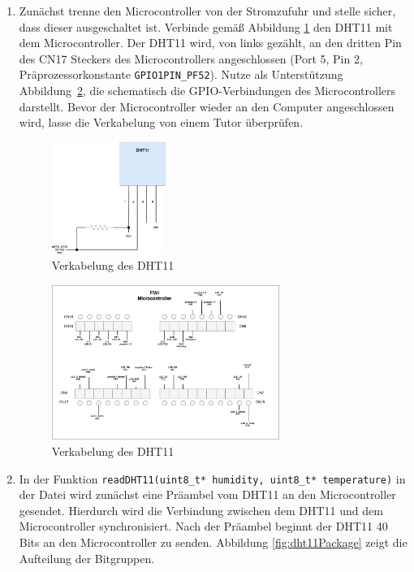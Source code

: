 \begin{enumerate}
\item 
Zunächst trenne den Microcontroller von der Stromzufuhr und stelle sicher, dass dieser ausgeschaltet ist.
Verbinde gemäß Abbildung \ref{fig:dht11Schematics} den DHT11 mit dem Microcontroller.
Der DHT11 wird, von links gezählt, an den dritten Pin des CN17 Steckers des Microcontrollers angeschlossen (Port 5, Pin 2, Präprozessorkonstante \lstinline|GPIO1PIN_PF52|).
Nutze als Unterstützung Abbildung~\ref{fig:cpppWiring}, die schematisch die GPIO-Verbindungen des Microcontrollers darstellt.
Bevor der Microcontroller wieder an den Computer angeschlossen wird, lasse die Verkabelung von einem Tutor überprüfen.
%
\begin{figure}[!htb]
	\centering
	\includegraphics[width=0.35\textwidth]{./05_c/figures/DHT11-Schematics.pdf}
	\caption{Verkabelung des DHT11}
	\label{fig:dht11Schematics}
\end{figure} 
\begin{figure}[!htb]
	\centering
	\includegraphics[width=0.7\textwidth]{./05_c/figures/cppp-wiring.pdf}
	\caption{Verkabelung des DHT11}
	\label{fig:cpppWiring}
\end{figure} 

\item 
In der Funktion \lstinline|readDHT11(uint8_t* humidity, uint8_t* temperature)| in der Datei  wird zunächst eine Präambel vom DHT11 an den Microcontroller gesendet.
Hierdurch wird die Verbindung zwischen dem DHT11 und dem Microcontroller synchronisiert. 
Nach der Präambel beginnt der DHT11 40 Bits an den Microcontroller zu senden.
Abbildung \ref{fig:dht11Package} zeigt die Aufteilung der Bitgruppen.


\end{enumerate}
